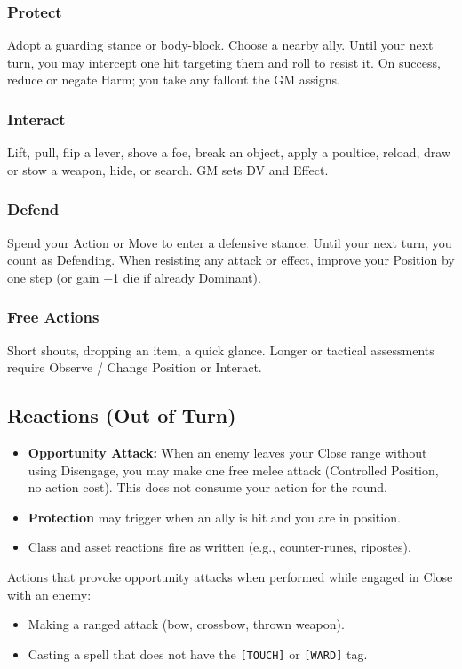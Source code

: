 \subsubsection{Protect}
Adopt a guarding stance or body-block. Choose a nearby ally. Until your next turn, you may intercept one hit targeting them and roll to resist it. On success, reduce or negate Harm; you take any fallout the GM assigns.

\subsubsection{Interact}
Lift, pull, flip a lever, shove a foe, break an object, apply a poultice, reload, draw or stow a weapon, hide, or search. GM sets DV and Effect.

\subsubsection{Defend}
Spend your Action or Move to enter a defensive stance. Until your next turn, you count as Defending. When resisting any attack or effect, improve your Position by one step (or gain +1 die if already Dominant).

\subsubsection{Free Actions}
Short shouts, dropping an item, a quick glance. Longer or tactical assessments require Observe / Change Position or Interact.

\subsection{Reactions (Out of Turn)}

\begin{itemize}
  \item \textbf{Opportunity Attack:} When an enemy leaves your Close range without using Disengage, you may make one free melee attack (Controlled Position, no action cost). This does not consume your action for the round.
  \item \textbf{Protection} may trigger when an ally is hit and you are in position.
  \item Class and asset reactions fire as written (e.g., counter-runes, ripostes).
\end{itemize}

Actions that provoke opportunity attacks when performed while engaged in Close with an enemy:
\begin{itemize}
  \item Making a ranged attack (bow, crossbow, thrown weapon).
  \item Casting a spell that does not have the \texttt{[TOUCH]} or \texttt{[WARD]} tag.
\end{itemize}

